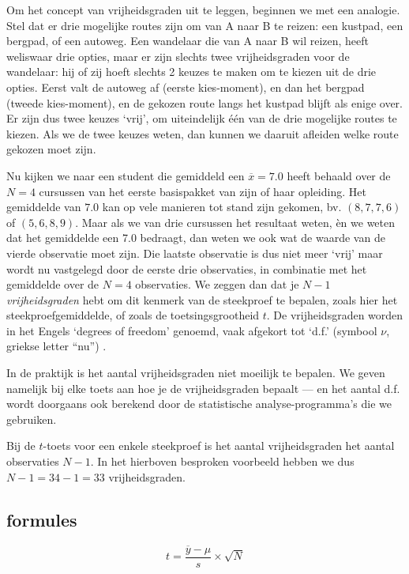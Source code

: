 \documentclass[
]{book}
\begin{document}
Om het concept van vrijheidsgraden uit te leggen, beginnen we met een
analogie. Stel dat er drie mogelijke routes zijn om van A naar B te
reizen: een kustpad, een bergpad, of een autoweg. Een wandelaar die van
A naar B wil reizen, heeft weliswaar drie opties, maar er zijn slechts
twee vrijheidsgraden voor de wandelaar: hij of zij hoeft slechts 2
keuzes te maken om te kiezen uit de drie opties. Eerst valt de autoweg
af (eerste kies-moment), en dan het bergpad (tweede kies-moment), en de
gekozen route langs het kustpad blijft als enige over. Er zijn dus twee
keuzes `vrij', om uiteindelijk één van de drie mogelijke routes te
kiezen. Als we de twee keuzes weten, dan kunnen we daaruit afleiden
welke route gekozen moet zijn.

Nu kijken we naar een student die gemiddeld een \(\overline{x}=7.0\) heeft
behaald over de \(N=4\) cursussen van het eerste basispakket van zijn of
haar opleiding. Het gemiddelde van \(7.0\) kan op vele manieren tot stand
zijn gekomen, bv. \((8,7,7,6)\) of \((5,6,8,9)\). Maar als we van drie
cursussen het resultaat weten, èn we weten dat het gemiddelde een 7.0
bedraagt, dan weten we ook wat de waarde van de vierde observatie moet
zijn. Die laatste observatie is dus niet meer `vrij' maar wordt nu
vastgelegd door de eerste drie observaties, in combinatie met het
gemiddelde over de \(N=4\) observaties. We zeggen dan dat je \(N-1\)
\emph{vrijheidsgraden} hebt om dit kenmerk van de steekproef te bepalen,
zoals hier het steekproefgemiddelde, of zoals de toetsingsgrootheid \(t\).
De vrijheidsgraden worden in het Engels `degrees of freedom' genoemd,
vaak afgekort tot `d.f.' (symbool \(\nu\), griekse letter ``nu'') .

In de praktijk is het aantal vrijheidsgraden niet moeilijk te bepalen.
We geven namelijk bij elke toets aan hoe je de vrijheidsgraden bepaalt
--- en het aantal d.f. wordt doorgaans ook berekend door de statistische
analyse-programma's die we gebruiken.

Bij de \(t\)-toets voor een enkele steekproef is het aantal vrijheidsgraden het
aantal observaties \(N-1\). In het hierboven besproken voorbeeld hebben we
dus \(N-1 = 34-1 = 33\) vrijheidsgraden.

\hypertarget{sec:formules13-1}{%
\subsection{formules}\label{sec:formules13-1}}

\begin{equation}
  t = \frac{ \overline{y}-\mu} { s } \times \sqrt{N}
  \label{eq:t-onesample}
\end{equation}
\end{document}

